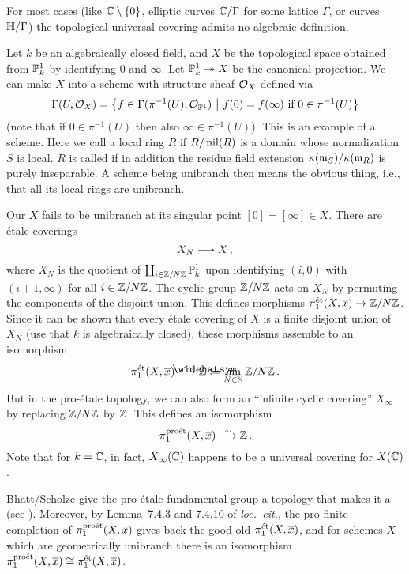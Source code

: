 \begin{exm}\label{exm:crippledP1}
	For most cases (like $\mathbb{C}\setminus\{0\}$, elliptic curves $\mathbb{C}/\Gamma$ for some lattice $\Gamma$, or curves $\mathbb{H}/\Gamma$) the topological universal covering admits no algebraic definition.
	
	Let $k$ be an algebraically closed field, and $X$ be the topological space obtained from $\mathbb{P}_k^1$ by identifying $0$ and $\infty$. Let $\IP_k^1\epimorphism X$ be the canonical projection. We can make $X$ into a scheme with structure sheaf $\mathcal{O}_X$ defined via
	\begin{equation*}
		\operatorname{\Gamma}(U,\mathcal{O}_X)=\left\{f\in\operatorname{\Gamma}(\pi^{-1}(U),\mathcal{O}_{\mathbb{P}^1})\ \middle|\  f(0)=f(\infty)\text{ if }0\in\pi^{-1}(U)\right\}
	\end{equation*}
	(note that if $0\in\pi^{-1}(U)$ then also $\infty\in\pi^{-1}(U)$). This is an example of a  scheme. Here we call a local ring $R$  if $R/\operatorname{nil}(R)$ is a domain whose normalization $S$ is local. $R$ is called  if in addition the residue field extension $\kappa(\mathfrak{m}_S)/\kappa(\mathfrak{m}_R)$ is purely inseparable. A scheme being unibranch then means the obvious thing, i.e., that all its local rings are unibranch.
	
	Our $X$ fails to be unibranch at its singular point $[0]=[\infty]\in X$. There are étale coverings
	\begin{equation*}
		X_N\morphism X\,,
	\end{equation*}
	where $X_N$ is the quotient of $\coprod_{i\in\mathbb{Z}/N\mathbb{Z}}\mathbb{P}_k^1$ upon identifying $(i,0)$ with $(i+1,\infty)$ for all $i\in\mathbb{Z}/N\mathbb{Z}$. The cyclic group $\mathbb{Z}/N\mathbb{Z}$ acts on $X_N$ by permuting the components of the disjoint union. This defines morphisms $\pi_1^\et(X,\ov{x})\morphism\IZ/N\IZ$. Since it can be shown that every étale covering of $X$ is a finite disjoint union of $X_N$ (use that $k$ is algebraically closed), these morphisms assemble to an isomorphism
	\begin{equation*}
		\pi_1^\et(X,\ov{x})\isomorphism\roof{\IZ}\coloneqq\limit_{N\in\IN}\IZ/N\IZ\,.
	\end{equation*}
	But in the pro-étale topology, we can also form an \enquote{infinite cyclic covering} $X_\infty$ by replacing $\mathbb{Z}/N\mathbb{Z}$ by $\mathbb{Z}$. This defines an isomorphism
	\begin{equation*}
		\pi_1^\proet(X,\ov{x})\isomorphism \IZ\,.
	\end{equation*}
	Note that for $k=\mathbb{C}$, in fact, $X_\infty(\mathbb{C})$ happens to be a universal covering for $X(\mathbb{C})$.
	
	Bhatt/Scholze give the pro-étale fundamental group a topology that makes it a  (see \cite[Definition~7.1.1]{proetale}). Moreover, by Lemma~7.4.3 and 7.4.10 of \emph{loc.\ cit.}, the pro-finite completion of $\pi_1^\proet(X,\ov{x})$ gives back the good old $\pi_1^\et(X,\ov{x})$, and for schemes $X$ which are geometrically unibranch there is an isomorphism $\pi_1^\proet(X,\ov{x})\cong \pi_1^\et(X,\ov{x})$.
\end{exm}
